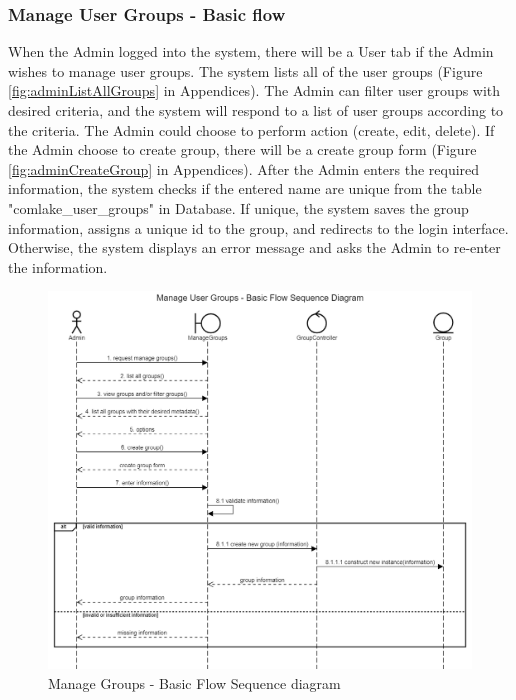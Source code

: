 \subsubsection{Manage User Groups - Basic flow}
When the Admin logged into the system, there will be a User tab if the Admin wishes to manage user groups. The system lists all of the user groups (Figure \ref{fig:adminListAllGroups} in Appendices). The Admin can filter user groups with desired criteria, and the system will respond to a list of user groups according to the criteria. The Admin could choose to perform action (create, edit, delete). If the Admin choose to create group, there will be a create group form (Figure \ref{fig:adminCreateGroup} in Appendices). After the Admin enters the required information, the system checks if the entered name are unique from the table "comlake\_user\_groups" in Database. If unique, the system saves the group information, assigns a unique id to the group, and redirects to the login interface. Otherwise, the system displays an error message and asks the Admin to re-enter the information. 
\begin{figure}[H]
    \centering
    \includegraphics[width=1.0\textwidth]{images/Manage User Groups - Basic Flow Sequence Diagram.png}
    \caption{Manage Groups - Basic Flow Sequence diagram}
    \label{fig:SeqGroupsBasic}
\end{figure}
